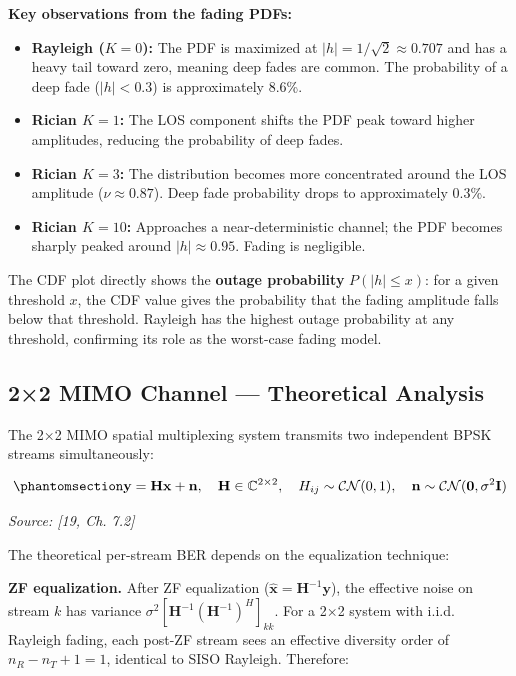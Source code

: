 \textbf{Key observations from the fading PDFs:}

\begin{itemize}
\tightlist
\item
  \textbf{Rayleigh (\(K=0\)):} The PDF is maximized at \(|h| = 1/\sqrt{2} \approx 0.707\) and has a heavy tail toward zero, meaning deep fades are common. The probability of a deep fade (\(|h| < 0.3\)) is approximately 8.6\%.
\item
  \textbf{Rician \(K=1\):} The LOS component shifts the PDF peak toward higher amplitudes, reducing the probability of deep fades.
\item
  \textbf{Rician \(K=3\):} The distribution becomes more concentrated around the LOS amplitude (\(\nu \approx 0.87\)). Deep fade probability drops to approximately 0.3\%.
\item
  \textbf{Rician \(K=10\):} Approaches a near-deterministic channel; the PDF becomes sharply peaked around \(|h| \approx 0.95\). Fading is negligible.
\end{itemize}

The CDF plot directly shows the \textbf{outage probability} \(P(|h| \leq x)\): for a given threshold \(x\), the CDF value gives the probability that the fading amplitude falls below that threshold. Rayleigh has the highest outage probability at any threshold, confirming its role as the worst-case fading model.


\subsection{2×2 MIMO Channel --- Theoretical Analysis}\label{sec:mimo-channel-theoretical-analysis}

The 2×2 MIMO spatial multiplexing system transmits two independent BPSK streams simultaneously:

\begin{equation}\protect\phantomsection\label{eq:mimo-received-2x2}{\mathbf{y} = \mathbf{H}\mathbf{x} + \mathbf{n}, \quad \mathbf{H} \in \mathbb{C}^{2 \times 2}, \quad H_{ij} \sim \mathcal{CN}(0, 1), \quad \mathbf{n} \sim \mathcal{CN}(\mathbf{0}, \sigma^2\mathbf{I})
}\end{equation} \par{\small\textit{Source: [19, Ch. 7.2]}}

The theoretical per-stream BER depends on the equalization technique:

\textbf{ZF equalization.} After ZF equalization (\(\hat{\mathbf{x}} = \mathbf{H}^{-1}\mathbf{y}\)), the effective noise on stream \(k\) has variance \(\sigma^2 [\mathbf{H}^{-1}(\mathbf{H}^{-1})^H]_{kk}\). For a 2×2 system with i.i.d. Rayleigh fading, each post-ZF stream sees an effective diversity order of \(n_R - n_T + 1 = 1\), identical to SISO Rayleigh. Therefore:

